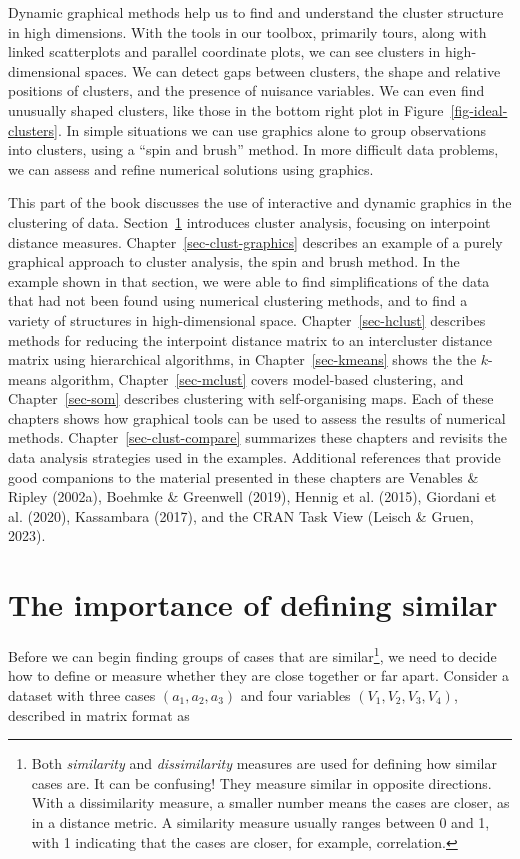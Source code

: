 \documentclass[
  letterpaper,
]{krantz}
\begin{document}
Dynamic graphical methods help us to find and understand the cluster
structure in high dimensions. With the tools in our toolbox, primarily
tours, along with linked scatterplots and parallel coordinate plots, we
can see clusters in high-dimensional spaces. We can detect gaps between
clusters, the shape and relative positions of clusters, and the presence
of nuisance variables. We can even find unusually shaped clusters, like
those in the bottom right plot in Figure~\ref{fig-ideal-clusters}. In
simple situations we can use graphics alone to group observations into
clusters, using a ``spin and brush'' method. In more difficult data
problems, we can assess and refine numerical solutions using
graphics.

This part of the book discusses the use of interactive and dynamic
graphics in the clustering of data. Section~\ref{sec-clust-bg}
introduces cluster analysis, focusing on interpoint distance measures.
Chapter~\ref{sec-clust-graphics} describes an example of a purely
graphical approach to cluster analysis, the spin and brush method. In
the example shown in that section, we were able to find simplifications
of the data that had not been found using numerical clustering methods,
and to find a variety of structures in high-dimensional space.
Chapter~\ref{sec-hclust} describes methods for reducing the interpoint
distance matrix to an intercluster distance matrix using hierarchical
algorithms, in Chapter~\ref{sec-kmeans} shows the the \(k\)-means
algorithm, Chapter~\ref{sec-mclust} covers model-based clustering, and
Chapter~\ref{sec-som} describes clustering with self-organising maps.
Each of these chapters shows how graphical tools can be used to assess
the results of numerical methods. Chapter~\ref{sec-clust-compare}
summarizes these chapters and revisits the data analysis strategies used
in the examples. Additional references that provide good companions to
the material presented in these chapters are Venables \& Ripley (2002a),
Boehmke \& Greenwell (2019), Hennig et al. (2015), Giordani et al.
(2020), Kassambara (2017), and the CRAN Task View (Leisch \& Gruen,
2023).

\section{The importance of defining similar}\label{sec-clust-bg}

Before we can begin finding groups of cases that are similar\footnote{Both
  \emph{similarity} and \emph{dissimilarity} measures are used for
  defining how similar cases are. It can be confusing! They measure
  similar in opposite directions. With a dissimilarity measure, a
  smaller number means the cases are closer, as in a distance metric. A
  similarity measure usually ranges between 0 and 1, with 1 indicating
  that the cases are closer, for example, correlation.}, we need to
decide how to define or measure whether they are close together or far
apart. Consider a dataset with three cases \((a_1, a_2, a_3)\) and four
variables \((V_1, V_2, V_3, V_4)\), described in matrix format as
\end{document}
